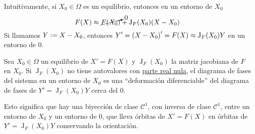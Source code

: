 Intuitivamente, si $X_0 \in \Omega$ es un equilibrio, entonces en un entorno de $X_0$
\[F(X) \approx \cancelto{0}{F(X_0)} + \operatorname{J}_F(X_0)(X-X_0)\]
Si llamamos $Y\vcentcolon= X-X_0$, entonces $\displaystyle Y' = \left(X-X_0\right)' = F(X) \approx \operatorname{J}_F(X_0)Y$ en un entorno de $0$.

\begin{teo}
	Sea $X_0 \in \Omega$ un equilibrio de $X'=F(X)$ y $\operatorname{J}_F(X_0)$ la matriz jacobiana de $F$ en $X_0$. Si $\operatorname{J}_F(X_0)$ no tiene autovalores con \underline{parte real nula}, el diagrama de fases del sistema en un entorno de $X_0$ es una ``deformación diferenciable'' del diagrama de fases de $Y' = \operatorname{J}_F(X_0)Y$ cerca del 0.

	Esto significa que hay una biyección de clase $\mathcal{C}^1$, con inversa de clase $\mathcal{C}^1$, entre un entorno de $X_0$ y un entorno de 0, que lleva órbitas de $X'=F(X)$ en órbitas de $Y' = \operatorname{J}_F(X_0)Y$ conservando la orientación.
\end{teo}


